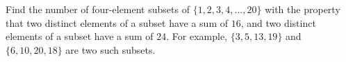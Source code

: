Find the number of four-element subsets of $\{1,2,3,4,\dots, 20\}$ with the property that two distinct elements of a subset have a sum of $16$,  and two distinct elements of a subset have a sum of $24$. For example, $\{3,5,13,19\}$ and $\{6,10,20,18\}$ are two such subsets.